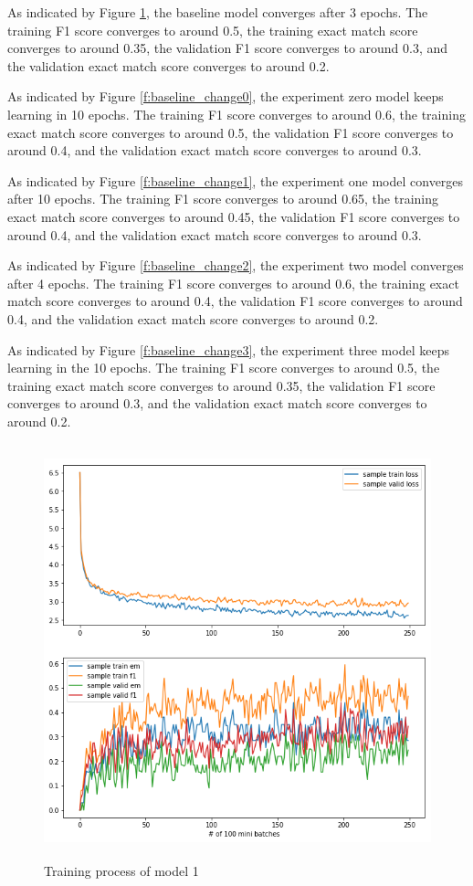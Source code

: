 \documentclass[modernstyle,12pt]{sjsuthesis}
\theoremstyle{definition}
\begin{document}
As indicated by Figure \ref{f:mlap}, the baseline model converges after 3 epochs. The training F1 score converges to around 0.5, the training exact match score converges to around 0.35, the validation F1 score converges to around 0.3, and the validation exact match score converges to around 0.2.

As indicated by Figure \ref{f:baseline_change0}, the experiment zero model keeps learning in 10 epochs. The training F1 score converges to around 0.6, the training exact match score converges to around 0.5, the validation F1 score converges to around 0.4, and the validation exact match score converges to around 0.3.

As indicated by Figure \ref{f:baseline_change1}, the experiment one model converges after 10 epochs. The training F1 score converges to around 0.65, the training exact match score converges to around 0.45, the validation F1 score converges to around 0.4, and the validation exact match score converges to around 0.3.

As indicated by Figure \ref{f:baseline_change2}, the experiment two model converges after 4 epochs. The training F1 score converges to around 0.6, the training exact match score converges to around 0.4, the validation F1 score converges to around 0.4, and the validation exact match score converges to around 0.2.

As indicated by Figure \ref{f:baseline_change3}, the experiment three model keeps learning in the 10 epochs. The training F1 score converges to around 0.5, the training exact match score converges to around 0.35, the validation F1 score converges to around 0.3, and the validation exact match score converges to around 0.2.

\begin{figure}[htbp]\centering
  \includegraphics[width=12cm, height=12cm]{figures/match_corrected.png}
  \caption{Training process of model 1}
  \label{f:mlap}
\end{figure}
\end{document}
